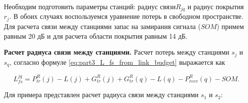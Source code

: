 










Необходим подготовить параметры станций: радиус связи$R_{jq}$ и радиус покрытия $r_j$. В обоих случаях воспользуемся уравнение потерь в свободном пространстве. Для расчета связи между станциями запас на замирания сигнала ($SOM$) примем равным 20 дБ и для расчета области покрытия равным 14 дБ.

\textbf{Расчет радиуса связи между станциями.}
Расчет потерь между станциями $s_j$ и $s_q$, согласно формуле \cref{eq:part3_L_fs_from_link_budget} выражается как


\begin{displaymath}
  L_{fs}^{jq} = P_{tr}^R(j) - L(j) + G_{tr}^R(j) + G_{tr}^R(q) - L(q) - P_{recv}^R(q) - SOM.
\end{displaymath}


Для примера представлен расчет радиуса связи между станциями $s_1 $ и $ s_2 $:

